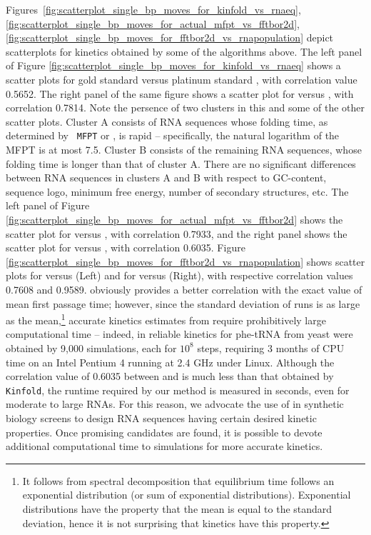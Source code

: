 Figures~\ref{fig:scatterplot_single_bp_moves_for_kinfold_vs_rnaeq},
\ref{fig:scatterplot_single_bp_moves_for_actual_mfpt_vs_fftbor2d},
\ref{fig:scatterplot_single_bp_moves_for_fftbor2d_vs_rnapopulation}
depict scatterplots for kinetics obtained by some of the algorithms
above. The left panel of
Figure \ref{fig:scatterplot_single_bp_moves_for_kinfold_vs_rnaeq}
shows a scatter plots for gold standard \rnamfpt versus platinum
standard \rnaeq, with correlation value 0.5652. The right
panel of the same figure shows a scatter plot for \kinfold versus
\rnaeq, with correlation 0.7814. Note the persence of two
clusters in this and some of the other scatter plots. Cluster A
consists of RNA sequences whose folding time, as determined by {\tt
MFPT} or \rnaeq, is rapid -- specifically, the natural
logarithm of the MFPT is at most 7.5. Cluster B consists of the
remaining RNA sequences, whose folding time is longer than that of
cluster A. There are no significant differences between RNA sequences
in clusters A and B with respect to GC-content, sequence logo, minimum
free energy, number of secondary structures, etc.  The left panel of
Figure \ref{fig:scatterplot_single_bp_moves_for_actual_mfpt_vs_fftbor2d}
shows the scatter plot for \rnamfpt versus \kinfold, with
correlation 0.7933, and the right panel shows the scatter plot for
\rnamfpt versus \fftmfpt, with correlation 0.6035.
Figure \ref{fig:scatterplot_single_bp_moves_for_fftbor2d_vs_rnapopulation}
shows scatter plots for \fftmfpt versus \kinfold (Left) and
for \fftmfpt versus \ffteq (Right), with respective
correlation values 0.7608 and 0.9589. \kinfold obviously provides
a better correlation with the exact value of mean first passage time;
however, since the standard deviation of \kinfold runs is as
large as the mean,\footnote{It follows from spectral decomposition that
equilibrium time follows an exponential distribution (or sum of
exponential distributions). Exponential distributions have the property
that the mean is equal to the standard deviation, hence
it is not surprising that \kinfold
kinetics have this property.} accurate kinetics estimates
from \kinfold require prohibitively large computational time -- indeed, in
\citep{wolfingerStadler:kinetics} reliable kinetics for phe-tRNA from
yeast were obtained by 9,000 \kinfold simulations, each for $10^8$
steps, requiring 3 months of CPU time on an Intel Pentium 4 running at
2.4 GHz under Linux. Although the correlation value of 0.6035 between
\rnamfpt and \fftmfpt is much less than that obtained by {\tt
Kinfold}, the runtime required by our method \fftmfpt is measured
in seconds, even for moderate to large RNAs. For this reason, we
advocate the use of \fftmfpt in synthetic biology screens to
design RNA sequences having certain desired kinetic properties. Once
promising candidates are found, it is possible to devote additional
computational time to \kinfold simulations for more accurate
kinetics.


